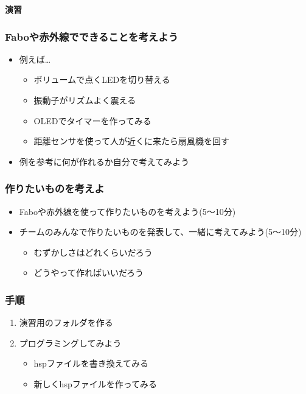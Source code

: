 \begin{frame}[plain]
    \begin{center}
        \vspace{48pt}
        {\huge\bf 演習}
    \end{center}
\end{frame}

\begin{frame}[fragile]
    \frametitle{Faboや赤外線でできることを考えよう}
    \begin{center}
        \begin{itemize}
            \item 例えば\dots
            \begin{itemize}
                \item ボリュームで点くLEDを切り替える
                \item 振動子がリズムよく震える
                \item OLEDでタイマーを作ってみる
                \item 距離センサを使って人が近くに来たら扇風機を回す
            \end{itemize}
            \item 例を参考に何が作れるか自分で考えてみよう
        \end{itemize}
    \end{center}
\end{frame}

\begin{frame}[fragile]
    \frametitle{作りたいものを考えよ}
    \begin{center}
        \begin{itemize}
            \item Faboや赤外線を使って作りたいものを考えよう(5〜10分)
            \item チームのみんなで作りたいものを発表して、一緒に考えてみよう(5〜10分)
            \begin{itemize}
                \item むずかしさはどれくらいだろう
                \item どうやって作ればいいだろう
            \end{itemize}
        \end{itemize}
    \end{center}
\end{frame}

\begin{frame}[fragile]
    \frametitle{手順}
    \begin{center}
        \begin{enumerate}
            \item 演習用のフォルダを作る
            \item プログラミングしてみよう
            \begin{itemize}
                \item hspファイルを書き換えてみる
                \item 新しくhspファイルを作ってみる
            \end{itemize}
        \end{enumerate}
    \end{center}
\end{frame}

